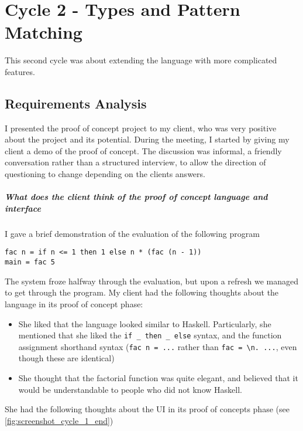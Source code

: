 \chapter{Cycle 2 - Types and Pattern Matching}
This second cycle was about extending the language with more complicated features. 

\section{Requirements Analysis}
I presented the proof of concept project to my client, who was very positive about the project and its potential. During the meeting, I started by giving my client a demo of the proof of concept. The discussion was informal, a friendly conversation rather than a structured interview, to allow the direction of questioning to change depending on the clients answers. 

\paragraph{What does the client think of the proof of concept language and interface}
I gave a brief demonstration of the evaluation of the following program 

\begin{verbatim}
fac n = if n <= 1 then 1 else n * (fac (n - 1))
main = fac 5
\end{verbatim}
The system froze halfway through the evaluation, but upon a refresh we managed to get through the program. My client had the following thoughts about the language in its proof of concept phase:

\begin{itemize}
    \item She liked that the language looked similar to Haskell. Particularly, she mentioned that she liked the \verb|if _ then _ else| syntax, and the function assignment shorthand syntax (\verb|fac n = ...| rather than \verb|fac = \n. ...|, even though these are identical)
    \item She thought that the factorial function was quite elegant, and believed that it would be understandable to people who did not know Haskell.  
\end{itemize}

She had the following thoughts about the UI in its proof of concepts phase (see \ref{fig:screenshot_cycle_1_end})

